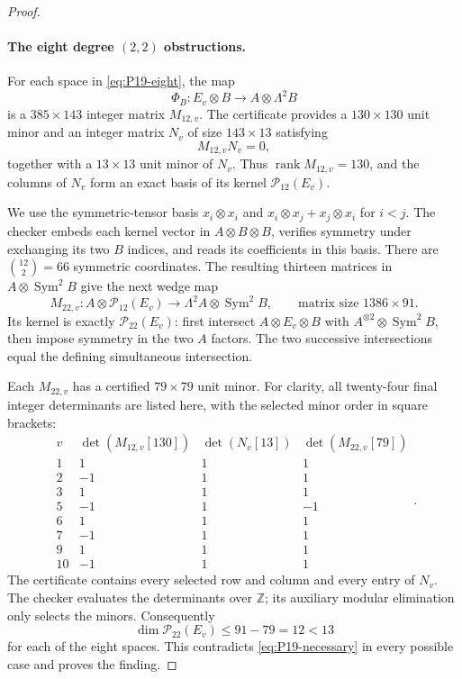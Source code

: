 \begin{proof}
\paragraph{The eight degree $(2,2)$ obstructions.}
For each space in \eqref{eq:P19-eight}, the map
\[
 \Phi_B:E_v\otimes B\longrightarrow A\otimes\Lambda^2B
\]
is a $385\times143$ integer matrix $M_{12,v}$.
The certificate provides a $130\times130$ unit minor and an integer
matrix $N_v$ of size $143\times13$ satisfying
\[
 M_{12,v}N_v=0,
\]
together with a $13\times13$ unit minor of $N_v$.
Thus $\operatorname{rank}M_{12,v}=130$, and the columns of $N_v$ form
an exact basis of its kernel $\mathcal P_{12}(E_v)$.

We use the symmetric-tensor basis
$x_i\otimes x_i$ and
$x_i\otimes x_j+x_j\otimes x_i$ for $i<j$.
The checker embeds each kernel vector in $A\otimes B\otimes B$,
verifies symmetry under exchanging its two $B$ indices, and reads its coefficients
in this basis.  There are $\binom{12}{2}=66$ symmetric coordinates.
The resulting thirteen matrices in $A\otimes\operatorname{Sym}^2B$
give the next wedge map
\[
 M_{22,v}:A\otimes\mathcal P_{12}(E_v)
       \longrightarrow\Lambda^2A\otimes\operatorname{Sym}^2B,
 \qquad \text{matrix size }1386\times91.
\]
Its kernel is exactly $\mathcal P_{22}(E_v)$: first intersect
$A\otimes E_v\otimes B$ with $A^{\otimes2}\otimes\operatorname{Sym}^2B$,
then impose symmetry in the two $A$ factors.  The two successive
intersections equal the defining simultaneous intersection.

Each $M_{22,v}$ has a certified $79\times79$ unit minor.
For clarity, all twenty-four final integer determinants are listed here,
with the selected minor order in square brackets:
\[
\begin{array}{c|r|r|r}
 v&\det(M_{12,v}[130])&\det(N_v[13])&\det(M_{22,v}[79])\\\hline
 1&1&1&1\\
 2&-1&1&1\\
 3&1&1&1\\
 5&-1&1&-1\\
 6&1&1&1\\
 7&-1&1&1\\
 9&1&1&1\\
 10&-1&1&1
\end{array}.
\]
The certificate contains every selected row and column and every entry
of $N_v$.  The checker evaluates the determinants over $\mathbb Z$;
its auxiliary modular elimination only selects the minors.
Consequently
\[
 \dim\mathcal P_{22}(E_v)
   \le91-79=12<13
\]
for each of the eight spaces.  This contradicts
\eqref{eq:P19-necessary} in every possible case and proves the finding.
\end{proof}


